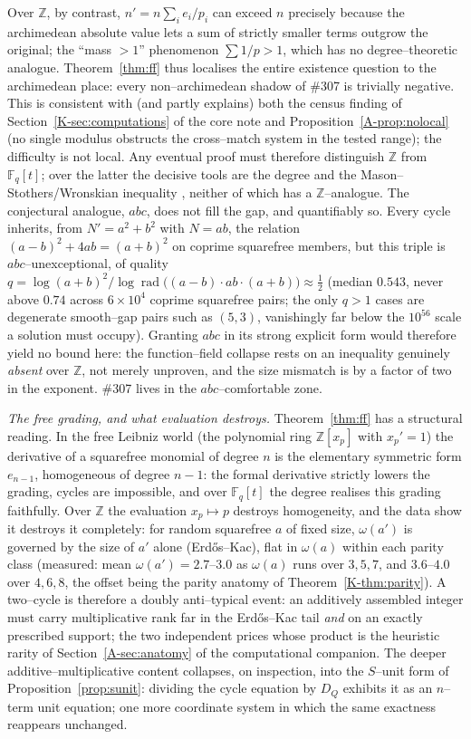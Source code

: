 \documentclass[11pt]{article}
\theoremstyle{definition}
\begin{document}
Over $\mathbb{Z}$, by contrast, $n'=n\sum_i e_i/p_i$ can exceed $n$ precisely because the archimedean
absolute value lets a sum of strictly smaller terms outgrow the original; the ``mass $>1$''
phenomenon $\sum 1/p>1$, which has no degree--theoretic analogue. Theorem~\ref{thm:ff} thus localises
the entire existence question to the archimedean place: every non--archimedean shadow of \#307 is
trivially negative. This is consistent with (and partly explains) both the census finding of
Section~\ref{K-sec:computations} of the core note and Proposition~\ref{A-prop:nolocal} (no single modulus obstructs the
cross--match system in the tested range); the difficulty is not local. Any eventual proof must therefore distinguish $\mathbb{Z}$ from $\mathbb{F}_q[t]$; over the
latter the decisive tools are the degree and the Mason--Stothers/Wronskian inequality
\cite{Stothers}, neither of which has a $\mathbb{Z}$--analogue. The conjectural analogue, $abc$,
does not fill the gap, and quantifiably so. Every cycle inherits, from $N'=a^2+b^2$ with $N=ab$, the
relation $(a-b)^2+4ab=(a+b)^2$ on coprime squarefree members, but this triple is $abc$--unexceptional,
of quality $q=\log(a+b)^2/\log\operatorname{rad}\!\bigl((a-b)\cdot ab\cdot(a+b)\bigr)\approx\tfrac12$
(median $0.543$, never above $0.74$ across $6\times10^4$ coprime squarefree pairs; the only $q>1$ cases
are degenerate smooth--gap pairs such as $(5,3)$, vanishingly far below the $10^{56}$ scale a solution
must occupy). Granting $abc$ in its strong explicit form would therefore yield no bound here: the
function--field collapse rests on an inequality genuinely \emph{absent} over $\mathbb{Z}$, not merely
unproven, and the size mismatch is by a factor of two in the exponent. \#307 lives in the
$abc$--comfortable zone.

\emph{The free grading, and what evaluation destroys.} Theorem~\ref{thm:ff} has a structural reading. In the free Leibniz world (the polynomial ring
$\mathbb{Z}[x_p]$ with $x_p'=1$) the derivative of a squarefree monomial of degree $n$ is the
elementary symmetric form $e_{n-1}$, homogeneous of degree $n-1$: the formal derivative strictly lowers
the grading, cycles are impossible, and over $\mathbb{F}_q[t]$ the degree realises this grading
faithfully. Over $\mathbb{Z}$ the evaluation $x_p\mapsto p$ destroys homogeneity, and the data show it
destroys it completely: for random squarefree $a$ of fixed size, $\omega(a')$ is governed by the size of
$a'$ alone (Erd\H{o}s--Kac), flat in $\omega(a)$ within each parity class (measured: mean
$\omega(a')=2.7$--$3.0$ as $\omega(a)$ runs over $3,5,7$, and $3.6$--$4.0$ over $4,6,8$, the offset being
the parity anatomy of Theorem~\ref{K-thm:parity}). A two--cycle is therefore a doubly anti--typical event:
an additively assembled integer must carry multiplicative rank far in the Erd\H{o}s--Kac tail \emph{and}
on an exactly prescribed support; the two independent prices whose product is the heuristic rarity of
Section~\ref{A-sec:anatomy} of the computational companion. The deeper additive--multiplicative content collapses, on inspection, into
the $S$--unit form of Proposition~\ref{prop:sunit}: dividing the cycle equation by $D_Q$ exhibits it as
an $n$--term unit equation; one more coordinate system in which the same exactness reappears
unchanged.
\end{document}
